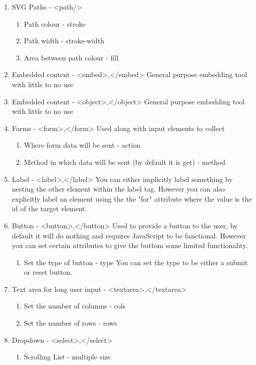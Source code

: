 \documentclass[11pt]{article}
\begin{document}
\begin{enumerate}
\begin{enumerate}
\item Colour fill - fill
\end{enumerate}
\item SVG Paths - <path/>
\begin{enumerate}
\item Path colour - stroke
\item Path width - stroke-width
\item Area between path colour - fill
\end{enumerate}
\item Embedded content - <embed>,</embed>
General purpose embedding tool with little to no use
\item Embedded content - <object>,</object>    
General purpose embedding tool with little to no use
\item Forms - <form>,</form>
Used along with input elements to collect
\begin{enumerate}
\item Where form data will be sent - action
\item Method in which data will be sent (by default it is get) - method
\end{enumerate}
\item Label - <label>,</label>
You can either implicitly label something by nesting the other element within the label tag.
However you can also explicitly label an element using the the "for" attribute where the value
is the id of the target element.
\item Button - <button>,</button>
Used to provide a button to the user, by default it will do nothing and requires JavaScript to
be functional. However you can set certain attributes to give the buttom some limited
functionality.
\begin{enumerate}
\item Set the type of button - type
You can set the type to be either a submit or reset button.
\end{enumerate}
\item Text area for long user input - <textarea>,</textarea>
\begin{enumerate}
\item Set the number of columns - cols
\item Set the number of rows - rows
\end{enumerate}
\item Dropdown - <select>,</select>
\begin{enumerate}
\item Scrolling List - multiple size

\end{enumerate}
\end{enumerate}
\end{document}

